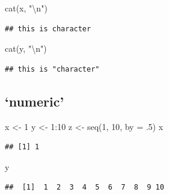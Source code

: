\documentclass[
]{article}
\newenvironment{Shaded}{\begin{snugshade}}{\end{snugshade}}
\newcommand{\AttributeTok}[1]{\textcolor[rgb]{0.77,0.63,0.00}{#1}}
\newcommand{\DecValTok}[1]{\textcolor[rgb]{0.00,0.00,0.81}{#1}}
\newcommand{\FunctionTok}[1]{\textcolor[rgb]{0.00,0.00,0.00}{#1}}
\newcommand{\NormalTok}[1]{#1}
\newcommand{\OtherTok}[1]{\textcolor[rgb]{0.56,0.35,0.01}{#1}}
\newcommand{\SpecialCharTok}[1]{\textcolor[rgb]{0.00,0.00,0.00}{#1}}
\newcommand{\StringTok}[1]{\textcolor[rgb]{0.31,0.60,0.02}{#1}}
\begin{document}
\begin{Shaded}
\begin{Highlighting}[]
\FunctionTok{cat}\NormalTok{(x, }\StringTok{"}\SpecialCharTok{\textbackslash{}n}\StringTok{"}\NormalTok{)}
\end{Highlighting}
\end{Shaded}

\begin{verbatim}
## this is character
\end{verbatim}

\begin{Shaded}
\begin{Highlighting}[]
\FunctionTok{cat}\NormalTok{(y, }\StringTok{"}\SpecialCharTok{\textbackslash{}n}\StringTok{"}\NormalTok{)}
\end{Highlighting}
\end{Shaded}

\begin{verbatim}
## this is "character"
\end{verbatim}

\hypertarget{numeric}{%
\subsection{`numeric'}\label{numeric}}

\begin{Shaded}
\begin{Highlighting}[]
\NormalTok{x }\OtherTok{\textless{}{-}} \DecValTok{1}
\NormalTok{y }\OtherTok{\textless{}{-}} \DecValTok{1}\SpecialCharTok{:}\DecValTok{10}
\NormalTok{z }\OtherTok{\textless{}{-}} \FunctionTok{seq}\NormalTok{(}\DecValTok{1}\NormalTok{, }\DecValTok{10}\NormalTok{, }\AttributeTok{by =}\NormalTok{ .}\DecValTok{5}\NormalTok{)}
\NormalTok{x}
\end{Highlighting}
\end{Shaded}

\begin{verbatim}
## [1] 1
\end{verbatim}

\begin{Shaded}
\begin{Highlighting}[]
\NormalTok{y}
\end{Highlighting}
\end{Shaded}

\begin{verbatim}
##  [1]  1  2  3  4  5  6  7  8  9 10
\end{verbatim}
\end{document}
